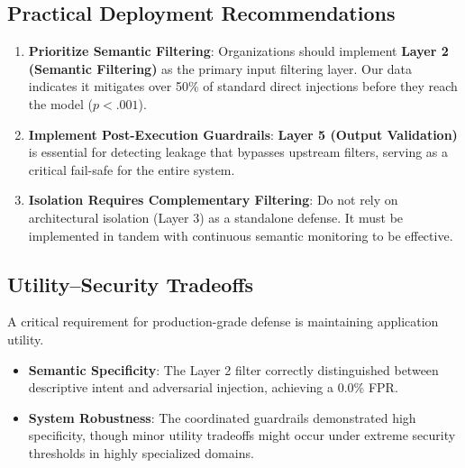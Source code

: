 \documentclass[conference]{IEEEtran}
\begin{document}
\subsection{Practical Deployment Recommendations}
\begin{enumerate}
    \item \textbf{Prioritize Semantic Filtering}: Organizations should implement \textbf{Layer 2 (Semantic Filtering)} as the primary input filtering layer. Our data indicates it mitigates over 50\% of standard direct injections before they reach the model ($p < .001$).
    \item \textbf{Implement Post-Execution Guardrails}: \textbf{Layer 5 (Output Validation)} is essential for detecting leakage that bypasses upstream filters, serving as a critical fail-safe for the entire system.
    \item \textbf{Isolation Requires Complementary Filtering}: Do not rely on architectural isolation (Layer 3) as a standalone defense. It must be implemented in tandem with continuous semantic monitoring to be effective.
\end{enumerate}

\subsection{Utility--Security Tradeoffs}
A critical requirement for production-grade defense is maintaining application utility.
\begin{itemize}
    \item \textbf{Semantic Specificity}: The Layer 2 filter correctly distinguished between descriptive intent and adversarial injection, achieving a 0.0\% FPR.
    \item \textbf{System Robustness}: The coordinated guardrails demonstrated high specificity, though minor utility tradeoffs might occur under extreme security thresholds in highly specialized domains.
\end{itemize}
\end{document}
